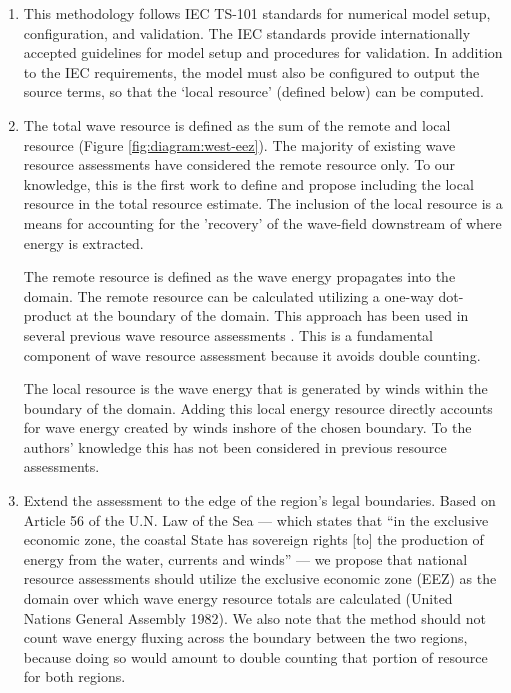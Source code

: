 \begin{enumerate}
    \item This methodology follows IEC TS-101 standards for numerical model setup, configuration, and validation. The IEC standards provide internationally accepted guidelines for model setup and procedures for validation. In addition to the IEC requirements, the model must also be configured to output the source terms, so that the `local resource' (defined below) can be computed.
    
    \item The total wave resource is defined as the sum of the remote and local resource (Figure \ref{fig:diagram:west-eez}). The majority of existing wave resource assessments have considered the remote resource only. To our knowledge, this is the first work to define and propose including the local resource in the total resource estimate. The inclusion of the local resource is a means for accounting for the 'recovery' of the wave-field downstream of where energy is extracted.
    
    The remote resource is defined as the wave energy propagates into the domain. The remote resource can be calculated utilizing a one-way dot-product at the boundary of the domain. This approach has been used in several previous wave resource assessments \citep{gunnQuantifyingGlobalWave2012, hemerRevisedAssessmentAustralia2017, regueroGlobalWavePower2015}. This is a fundamental component of wave resource assessment because it avoids double counting.
    
    The local resource is the wave energy that is generated by winds within the boundary of the domain. Adding this local energy resource directly accounts for wave energy created by winds inshore of the chosen boundary. To the authors' knowledge this has not been considered in previous resource assessments.

    \item Extend the assessment to the edge of the region's legal boundaries. Based on Article 56 of the U.N. Law of the Sea — which states that ``in the exclusive economic zone, the coastal State has sovereign rights [to] the production of energy from the water, currents and winds'' — we propose that national resource assessments should utilize the exclusive economic zone (EEZ) as the domain over which wave energy resource totals are calculated (United Nations General Assembly 1982). We also note that the method should not count wave energy fluxing across the boundary between the two regions, because doing so would amount to double counting that portion of resource for both regions.
\end{enumerate}


